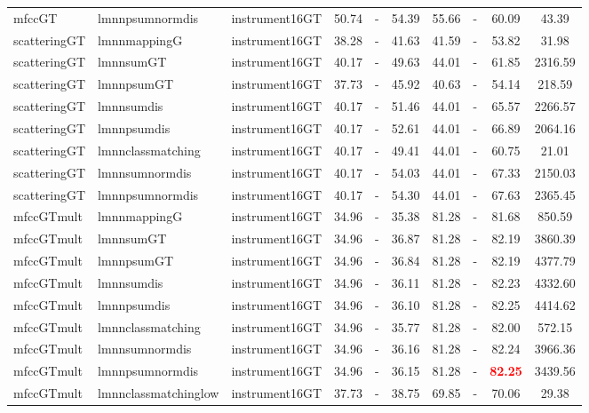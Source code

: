 \begin{tabular}{lllccccccc}
mfccGT & lmnnpsumnormdis & instrument16GT & 50.74 &   - & 54.39 & 55.66 &   - & 60.09 &     43.39 \\ 
scatteringGT & lmnnmappingG & instrument16GT & 38.28 &   - & 41.63 & 41.59 &   - & 53.82 &     31.98 \\ 
scatteringGT & lmnnsumGT & instrument16GT & 40.17 &   - & 49.63 & 44.01 &   - & 61.85 &   2316.59 \\ 
scatteringGT & lmnnpsumGT & instrument16GT & 37.73 &   - & 45.92 & 40.63 &   - & 54.14 &    218.59 \\ 
scatteringGT & lmnnsumdis & instrument16GT & 40.17 &   - & 51.46 & 44.01 &   - & 65.57 &   2266.57 \\ 
scatteringGT & lmnnpsumdis & instrument16GT & 40.17 &   - & 52.61 & 44.01 &   - & 66.89 &   2064.16 \\ 
scatteringGT & lmnnclassmatching & instrument16GT & 40.17 &   - & 49.41 & 44.01 &   - & 60.75 &     21.01 \\ 
scatteringGT & lmnnsumnormdis & instrument16GT & 40.17 &   - & 54.03 & 44.01 &   - & 67.33 &   2150.03 \\ 
scatteringGT & lmnnpsumnormdis & instrument16GT & 40.17 &   - & 54.30 & 44.01 &   - & 67.63 &   2365.45 \\ 
mfccGTmult & lmnnmappingG & instrument16GT & 34.96 &   - & 35.38 & 81.28 &   - & 81.68 &    850.59 \\ 
mfccGTmult & lmnnsumGT & instrument16GT & 34.96 &   - & 36.87 & 81.28 &   - & 82.19 &   3860.39 \\ 
mfccGTmult & lmnnpsumGT & instrument16GT & 34.96 &   - & 36.84 & 81.28 &   - & 82.19 &   4377.79 \\ 
mfccGTmult & lmnnsumdis & instrument16GT & 34.96 &   - & 36.11 & 81.28 &   - & 82.23 &   4332.60 \\ 
mfccGTmult & lmnnpsumdis & instrument16GT & 34.96 &   - & 36.10 & 81.28 &   - & 82.25 &   4414.62 \\ 
mfccGTmult & lmnnclassmatching & instrument16GT & 34.96 &   - & 35.77 & 81.28 &   - & 82.00 &    572.15 \\ 
mfccGTmult & lmnnsumnormdis & instrument16GT & 34.96 &   - & 36.16 & 81.28 &   - & 82.24 &   3966.36 \\ 
mfccGTmult & lmnnpsumnormdis & instrument16GT & 34.96 &   - & 36.15 & 81.28 &   - & \textbf{\textcolor{red}{82.25}} &   3439.56 \\ 
mfccGTmult & lmnnclassmatchinglow & instrument16GT & 37.73 &   - & 38.75 & 69.85 &   - & 70.06 &     29.38 \\ 

\end{tabular}
